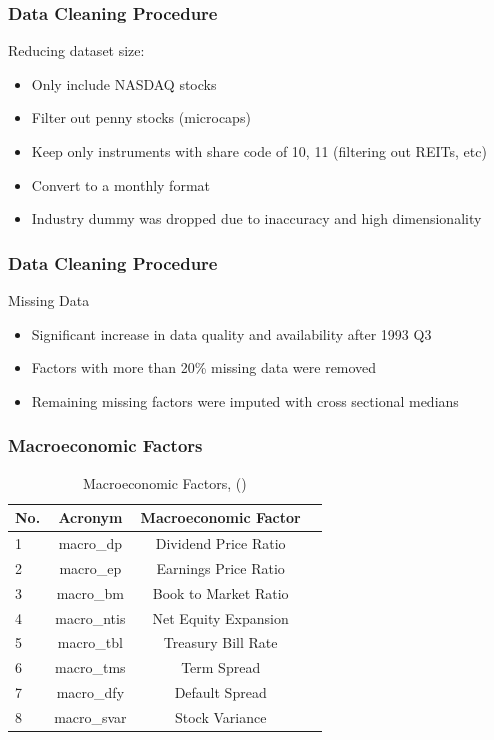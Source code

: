 \documentclass[aspectratio=169]{beamer}
\begin{document}
\begin{frame}
\frametitle{Data Cleaning Procedure}
Reducing dataset size:
\begin{itemize}
	\item Only include NASDAQ stocks
	\item Filter out penny stocks (microcaps)
	\item Keep only instruments with share code of 10, 11 (filtering out REITs, etc)
	\item Convert to a monthly format
	\item Industry dummy was dropped due to inaccuracy and high dimensionality
\end{itemize}
\end{frame}

\begin{frame}
\frametitle{Data Cleaning Procedure}
Missing Data
\begin{itemize}
	\item Significant increase in data quality and availability after 1993 Q3
	\item Factors with more than 20\% missing data were removed
	\item Remaining missing factors were imputed with cross sectional medians
\end{itemize}
\end{frame}

\begin{frame}
\frametitle{Macroeconomic Factors}
\begin{table}
	\caption{Macroeconomic Factors, (\cite{welch_comprehensive_2008})}
	\begin{center}
		\begin{tabular}{lccc} \hline
			No. & Acronym & Macroeconomic Factor \\ \hline
			1 & macro\_dp & Dividend Price Ratio \\
			2 & macro\_ep & Earnings Price Ratio \\
			3 & macro\_bm & Book to Market Ratio \\
			4 & macro\_ntis & Net Equity Expansion \\
			5 & macro\_tbl & Treasury Bill Rate \\
			6 & macro\_tms & Term Spread \\
			7 & macro\_dfy & Default Spread \\
			8 & macro\_svar & Stock Variance \\ \hline
		\end{tabular}
	\end{center}
\end{table}
\end{frame}
\end{document}
